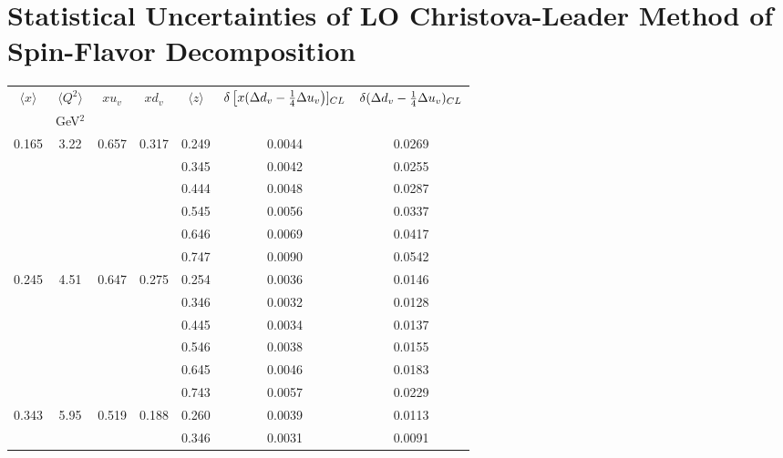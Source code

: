 \section{ Statistical Uncertainties of LO Christova-Leader Method of Spin-Flavor Decomposition}
\begin{table}[htbp]
\begin{center}
\begin{tabular}{|ccccc||c|c|}
\hline
$\langle x \rangle $   & $ \langle Q^2 \rangle $   & $x  u_v$ & $x d_v$ & $\langle z \rangle$ & $\delta \left[x( \Delta d_v -{1 \over 4} \Delta u_v \right)]_{CL}$  &
$\delta ( \Delta d_v -{1 \over 4} \Delta u_v )_{CL}$  \\
                       & GeV$^2$              &          &    &       &     &                                                              \\ \hline \hline
   0.165 &    3.22 &   0.657 &    0.317 &    0.249 &    0.0044 &    0.0269 \\
         &          &          &          &    0.345 &    0.0042 &    0.0255 \\
         &          &          &          &    0.444 &    0.0048 &    0.0287 \\
         &          &          &          &    0.545 &    0.0056 &    0.0337 \\
         &          &          &          &    0.646 &    0.0069 &    0.0417 \\
         &          &          &          &    0.747 &    0.0090 &    0.0542 \\
   0.245 &    4.51 &   0.647 &    0.275 &    0.254 &    0.0036 &    0.0146 \\
         &          &          &          &    0.346 &    0.0032 &    0.0128 \\
         &          &          &          &    0.445 &    0.0034 &    0.0137 \\
         &          &          &          &    0.546 &    0.0038 &    0.0155 \\
         &          &          &          &    0.645 &    0.0046 &    0.0183 \\
         &          &          &          &    0.743 &    0.0057 &    0.0229 \\
   0.343 &    5.95 &   0.519 &    0.188 &    0.260 &    0.0039 &    0.0113 \\
         &          &          &          &    0.346 &    0.0031 &    0.0091 \\

\end{tabular}
\end{center}
\end{table}
